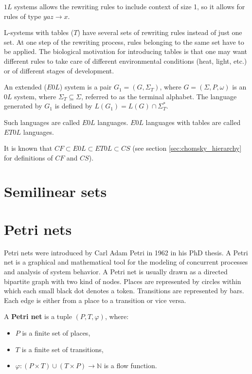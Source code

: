 $1L$ systems allows the rewriting rules to include context of size 1, so it allows for rules of type $yaz\rightarrow x$.

L-systems with tables ($T$) have several sets of rewriting rules instead of just one set. At one step of the rewriting process, rules belonging to the same set have to be applied. The biological motivation for introducing tables is that one may want different rules to take care of different environmental conditions (heat, light, etc.) or of different stages of development.

\begin{definition}
An extended ($E0L$) system is a pair $G_1 = (G, \Sigma_T)$, where $G = (\Sigma, P, \omega)$ is an $0L$ system, where $\Sigma_T \subseteq \Sigma$, referred to as the terminal alphabet. The language generated by $G_1$ is defined by $L(G_1) = L(G)\cap \Sigma_T^*$.
\end{definition}

Such languages are called $E0L$ languages. $E0L$ languages with tables are called $ET0L$ languages.

It is known that $CF \subset E0L \subset ET0L \subset CS$ (see section \ref{sec:chomsky_hierarchy} for definitions of $CF$ and $CS$).

\section{Semilinear sets} %
\label{sec:semilinear_sets}


\section{Petri nets} %
\label{sec:petri_nets}

Petri nets \cite{Petri62,Yen06PetriNets} were introduced by Carl Adam Petri in 1962 in his PhD thesis. A Petri net is a graphical and mathematical tool for the modeling of concurrent processes and analysis of system behavior. A Petri net is usually drawn as a directed bipartite graph with two kind of nodes. Places are represented by circles within which each small black dot denotes a token. Transitions are represented by bars. Each edge is either from a place to a transition or vice versa.

\begin{definition}
  A {\bf Petri net} is a tuple $(P, T, \varphi)$, where:
  \begin{itemize}
    \item $P$ is a finite set of places,
    \item $T$ is a finite set of transitions,
    \item $\varphi: (P\times T)\cup(T\times P)\rightarrow \mathbb N$ is a flow function.
  \end{itemize}
\end{definition}

